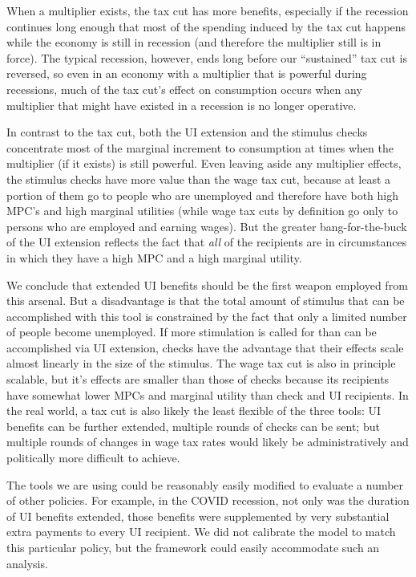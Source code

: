 \documentclass[../HAFiscal]{subfiles}
\begin{document}
When a multiplier exists, the tax cut has more benefits, especially if the recession continues long enough that most of the spending induced by the tax cut happens while the economy is still in recession (and therefore the multiplier still is in force).  The typical recession, however, ends long before our ``sustained'' tax cut is reversed, so even in an economy with a multiplier that is powerful during recessions, much of the tax cut's effect on consumption occurs when any multiplier that might have existed in a recession is no longer operative.

In contrast to the tax cut, both the UI extension and the stimulus checks concentrate most of the marginal increment to consumption at times when the multiplier (if it exists) is still powerful.  Even leaving aside any multiplier effects, the stimulus checks have more value than the wage tax cut, because at least a portion of them go to people who are unemployed and therefore have both high MPC's and high marginal utilities (while wage tax cuts by definition go only to persons who are employed and earning wages).  But the greater bang-for-the-buck of the UI extension reflects the fact that \textit{all} of the recipients are in circumstances in which they have a high MPC and a high marginal utility.

We conclude that extended UI benefits should be the first weapon employed from this arsenal.  But a disadvantage is that the total amount of stimulus that can be accomplished with this tool is constrained by the fact that only a limited number of people become unemployed.  If more stimulation is called for than can be accomplished via UI extension, checks have the advantage that their effects scale almost linearly in the size of the stimulus.  The wage tax cut is also in principle scalable, but it's effects are smaller than those of checks because its recipients have somewhat lower MPCs and marginal utility than check and UI recipients.  In the real world, a tax cut is also likely the least flexible of the three tools:  UI benefits can be further extended, multiple rounds of checks can be sent; but multiple rounds of changes in wage tax rates would likely be administratively and politically more difficult to achieve.

The tools we are using could be reasonably easily modified to evaluate a number of other policies.  For example, in the COVID recession, not only was the duration of UI benefits extended, those benefits were supplemented by very substantial extra payments to every UI recipient.  We did not calibrate the model to match this particular policy, but the framework could easily accommodate such an analysis.
\end{document}
